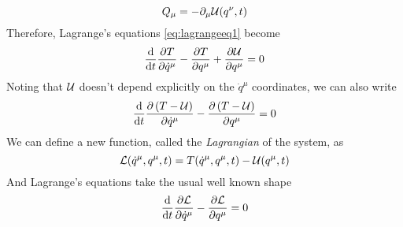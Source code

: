 \documentclass[../admech.tex]{subfiles}
\begin{document}
\begin{equation*}
	Q_\mu=-\partial_\mu\mathcal{U}(q^\nu,t)
\end{equation*}
Therefore, Lagrange's equations \eqref{eq:lagrangeeq1} become
\begin{equation*}
	\dv{t}\pdv{T}{\dot{q}^\mu}-\pdv{T}{q^\mu}+\pdv{\mathcal{U}}{q^\mu}=0
\end{equation*}
Noting that $\mathcal{U}$ doesn't depend explicitly on the $\dot{q}^\mu$ coordinates, we can also write
\begin{equation*}
	\dv{t}\pdv{\left( T-\mathcal{U}\right)}{\dot{q}^\mu}-\pdv{\left( T-\mathcal{U}\right)}{q^\mu}=0
\end{equation*}
We can define a new function, called the \emph{Lagrangian} of the system, as
\begin{equation}
	\mathcal{L}(\dot{q}^\mu,q^\mu,t)=T(\dot{q}^\mu,q^\mu,t)-\mathcal{U}(q^\mu,t)
	\label{eq:lagrangian}
\end{equation}
And Lagrange's equations take the usual well known shape
\begin{equation}
	\dv{t}\pdv{\mathcal{L}}{\dot{q}^\mu}-\pdv{\mathcal{L}}{q^\mu}=0
	\label{eq:lagrangeeq1final}
\end{equation}
\end{document}
